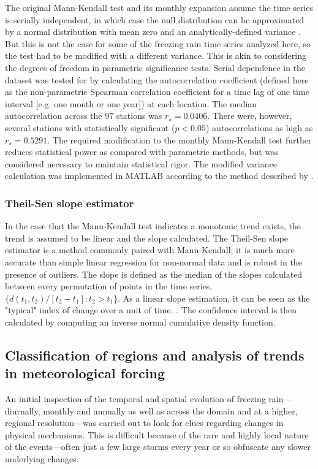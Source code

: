 \documentclass[twocol]{ametsoc}
\begin{document}
The original Mann-Kendall test and its monthly expansion assume the time series is serially independent, in which case the null distribution can be approximated by a normal distribution with mean zero and an analytically-defined variance \citep{kendall1955rank}. But this is not the case for some of the freezing rain time series analyzed here, so the test had to be modified with a different variance. This is akin to considering the degrees of freedom in parametric significance tests. Serial dependence in the dataset was tested for by calculating the autocorrelation coefficient (defined here as the non-parametric Spearman correlation coefficient for a time lag of one time interval [e.g. one month or one year]) at each location. The median autocorrelation across the 97 stations was $r_s = 0.0406$. There were, however, several stations with statistically significant ($p<0.05$) autocorrelations as high as $r_s = 0.5291$. The required modification to the monthly Mann-Kendall test further reduces statistical power as compared with parametric methods, but was considered necessary to maintain statistical rigor. The modified variance calculation was implemented in MATLAB according to the method described by \citet{hirsch1984nonparametric}. 

\subsubsection{Theil-Sen slope estimator}
In the case that the Mann-Kendall test indicates a monotonic trend exists, the trend is assumed to be linear and the slope calculated. The Theil-Sen slope estimator is a method commonly paired with Mann-Kendall; it is much more accurate than simple linear regression for non-normal data and is robust in the presence of outliers. The slope is defined as the median of the slopes calculated between every permutation of points in the time series, $\{d(t_1,t_2)/[t_2-t_1]:t_2>t_1\}$. As a linear slope estimation, it can be seen as the "typical" index of change over a unit of time. \citep{chandler2011statistical}. The confidence interval is then calculated by computing an inverse normal cumulative density function.

\subsection{Classification of regions and analysis of trends in meteorological forcing}
An initial inspection of the temporal and spatial evolution of freezing rain---diurnally, monthly and annually as well as across the domain and at a higher, regional resolution---was carried out to look for clues regarding changes in physical mechanisms.  This is difficult because of the rare and highly local nature of the events---often just a few large storms every year or so obfuscate any slower underlying changes.
\end{document}
